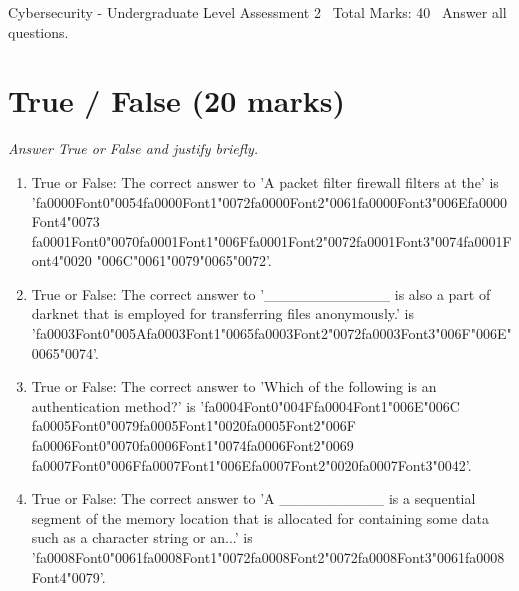 \documentclass[12pt]{article}
\begin{document}
\begin{center}
Cybersecurity - Undergraduate Level Assessment 2 \
Total Marks: 40 \
Answer all questions.
\end{center}

\section*{True / False (20 marks)}
\textit{Answer True or False and justify briefly.}
\begin{enumerate}[label=\arabic*.]
\item True or False: The correct answer to 'A packet filter firewall filters at the' is '{\csname fa0000Font0\endcsname\char"0054}{\csname fa0000Font1\endcsname\char"0072}{\csname fa0000Font2\endcsname\char"0061}{\csname fa0000Font3\endcsname\char"006E}{\csname fa0000Font4\endcsname\char"0073} {\csname fa0001Font0\endcsname\char"0070}{\csname fa0001Font1\endcsname\char"006F}{\csname fa0001Font2\endcsname\char"0072}{\csname fa0001Font3\endcsname\char"0074}{\csname fa0001Font4\endcsname\char"0020} {\char"006C}{\char"0061}{\char"0079}{\char"0065}{\char"0072}'.
\item True or False: The correct answer to '\_\_\_\_\_\_\_\_\_\_\_\_ is also a part of darknet that is employed for transferring files anonymously.' is '{\csname fa0003Font0\endcsname\char"005A}{\csname fa0003Font1\endcsname\char"0065}{\csname fa0003Font2\endcsname\char"0072}{\csname fa0003Font3\endcsname\char"006F}{\char"006E}{\char"0065}{\char"0074}'.
\item True or False: The correct answer to 'Which of the following is an authentication method?' is '{\csname fa0004Font0\endcsname\char"004F}{\csname fa0004Font1\endcsname\char"006E}{\char"006C} {\csname fa0005Font0\endcsname\char"0079}{\csname fa0005Font1\endcsname\char"0020}{\csname fa0005Font2\endcsname\char"006F} {\csname fa0006Font0\endcsname\char"0070}{\csname fa0006Font1\endcsname\char"0074}{\csname fa0006Font2\endcsname\char"0069} {\csname fa0007Font0\endcsname\char"006F}{\csname fa0007Font1\endcsname\char"006E}{\csname fa0007Font2\endcsname\char"0020}{\csname fa0007Font3\endcsname\char"0042}'.
\item True or False: The correct answer to 'A \_\_\_\_\_\_\_\_\_\_ is a sequential segment of the memory location that is allocated for containing some data such as a character string or an...' is '{\csname fa0008Font0\endcsname\char"0061}{\csname fa0008Font1\endcsname\char"0072}{\csname fa0008Font2\endcsname\char"0072}{\csname fa0008Font3\endcsname\char"0061}{\csname fa0008Font4\endcsname\char"0079}'.

\end{enumerate}
\end{document}
